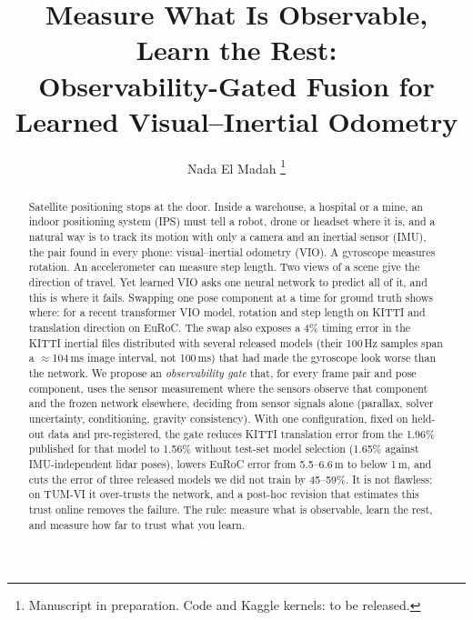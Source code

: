 \documentclass[letterpaper,journal]{IEEEtran}
\begin{document}
\title{Measure What Is Observable, Learn the Rest:\\Observability-Gated Fusion for Learned Visual--Inertial Odometry}

\author{Nada El Madah%
\thanks{Manuscript in preparation. Code and Kaggle kernels: to be released.}}


\maketitle

\begin{abstract}
Satellite positioning stops at the door. Inside a warehouse, a hospital or a mine, an indoor positioning system (IPS) must tell a robot, drone or headset where it is, and a natural way is to track its motion with only a camera and an inertial sensor (IMU), the pair found in every phone: visual--inertial odometry (VIO). A gyroscope measures rotation. An accelerometer can measure step length. Two views of a scene give the direction of travel. Yet learned VIO asks one neural network to predict all of it, and this is where it fails. Swapping one pose component at a time for ground truth shows where: for a recent transformer VIO model, rotation and step length on KITTI and translation direction on EuRoC. The swap also exposes a 4\% timing error in the KITTI inertial files distributed with several released models (their 100\,Hz samples span a $\approx$104\,ms image interval, not 100\,ms) that had made the gyroscope look worse than the network. We propose an \emph{observability gate} that, for every frame pair and pose component, uses the sensor measurement where the sensors observe that component and the frozen network elsewhere, deciding from sensor signals alone (parallax, solver uncertainty, conditioning, gravity consistency). With one configuration, fixed on held-out data and pre-registered, the gate reduces KITTI translation error from the 1.96\% published for that model to 1.56\% without test-set model selection (1.65\% against IMU-independent lidar poses), lowers EuRoC error from 5.5--6.6\,m to below 1\,m, and cuts the error of three released models we did not train by 45--59\%. It is not flawless: on TUM-VI it over-trusts the network, and a post-hoc revision that estimates this trust online removes the failure. The rule: measure what is observable, learn the rest, and measure how far to trust what you learn.
\end{abstract}
\end{document}
